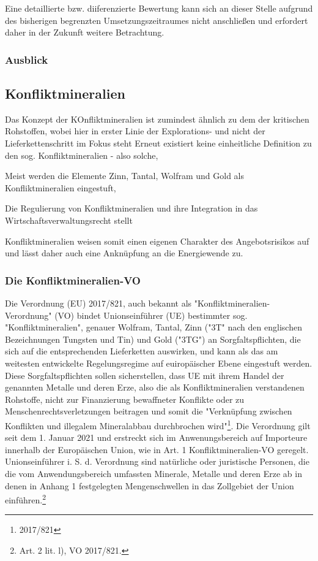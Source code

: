 \documentclass[12pt,a4paper,oneside]{book} %
\begin{document}
Eine detaillierte bzw. diiferenzierte Bewertung kann sich an dieser Stelle aufgrund des bisherigen begrenzten Umsetzungszeitraumes nicht anschließen und erfordert daher in der Zukunft weitere Betrachtung.

\subsubsection{Ausblick}



\subsection{Konfliktmineralien}
Das Konzept der KOnfliktmineralien ist zumindest ähnlich zu dem der kritischen Rohstoffen, wobei hier in erster Linie der Explorations- und nicht der Lieferkettenschritt im Fokus steht Erneut existiert keine einheitliche Definition zu den sog. Konfliktmineralien - also solche, 

Meist werden die Elemente Zinn, Tantal, Wolfram und Gold als Konfliktmineralien eingestuft, 

Die Regulierung von Konfliktmineralien und ihre Integration in das Wirtschaftsverwaltungsrecht stellt 

Konfliktmineralien weisen somit einen eigenen Charakter des Angebotsrisikos auf und lässt daher auch eine Anknüpfung an die Energiewende zu.\autocite{Church, C., & Crawford, A. (2020). Minerals and Metals for the Energy Transition: Exploring the Conflict Implications for Mineral-Rich, Fragile States. In M. Hafner, & S. Tagliapietra, The Geopolitics of the Global Energy Transition. Springer Cham.}

\subsubsection{Die Konfliktmineralien-VO}
Die Verordnung (EU) 2017/821, auch bekannt als "Konfliktmineralien-Verordnung" (VO) bindet Unionseinführer (UE) bestimmter sog. "Konfliktmineralien", genauer Wolfram, Tantal, Zinn ("3T" nach den englischen Bezeichnungen Tungsten und Tin) und Gold ("3TG") an Sorgfaltspflichten, die sich auf die entsprechenden Lieferketten auswirken, und kann als das am weitesten entwickelte Regelungsregime auf euiropäischer Ebene eingestuft werden\autocite{Kalls, ZfPW 2024, 181, 199}. Diese Sorgfaltspflichten sollen sicherstellen, dass UE mit ihrem Handel der genannten Metalle und deren Erze, also die als Konfliktmineralien verstandenen Rohstoffe, nicht zur Finanzierung bewaffneter Konflikte oder zu Menschenrechtsverletzungen beitragen und somit die "Verknüpfung zwischen Konflikten und illegalem Mineralabbau durchbrochen wird"\footnote{2017/821}. Die Verordnung gilt seit dem 1. Januar 2021 und erstreckt sich im Anwenungsbereich auf Importeure innerhalb der Europäischen Union, wie in Art. 1 Konfliktmineralien-VO geregelt. Unionseinführer i. S. d. Verordnung sind natürliche oder juristische Personen, die die vom Anwendungsbereich umfassten Minerale, Metalle und deren Erze ab in denen in Anhang 1 festgelegten Mengenschwellen in das Zollgebiet der Union einführen.\footnote{Art. 2 lit. l), VO 2017/821.} 
\end{document}
